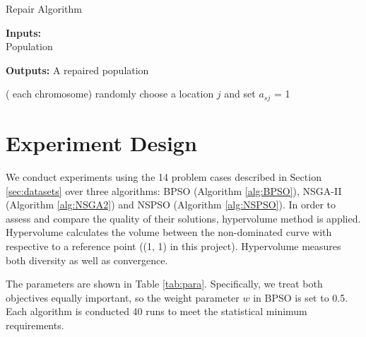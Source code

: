 


\begin{algorithm}[!h]
	\caption{Repair Algorithm}
	\footnotesize
	\label{alg:repair}
	\textbf{Inputs:} \\
		Population

	\textbf{Outputs:}
		A repaired population

	\begin{algorithmic}[1]
		\For( each chromosome)
		\State randomly choose a location $j$ and set $a_{sj}$ = 1
		\EndWhile
% 		
	\end{algorithmic}
	\label{alg:repairfunctions}
\end{algorithm}





\section{Experiment Design}
We conduct experiments using the 14 problem cases described in Section \ref{sec:datasets} over three algorithms: BPSO (Algorithm \ref{alg:BPSO}), NSGA-II (Algorithm \ref{alg:NSGA2}) and NSPSO (Algorithm \ref{alg:NSPSO}). In order to assess and compare the quality of their solutions, 
hypervolume method \cite{Auger:2009} is applied. Hypervolume calculates the volume between the non-dominated curve with respective to a reference point ((1, 1) 
in this project). Hypervolume measures both diversity as well as convergence.

The parameters are shown in Table \ref{tab:para}. Specifically, we treat both objectives equally important, so the weight parameter $w$ in BPSO is set 
to 0.5. Each algorithm is conducted 40 runs to meet the statistical minimum requirements.

